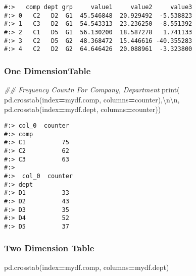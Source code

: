 \documentclass[
]{book}
\newenvironment{Shaded}{\begin{snugshade}}{\end{snugshade}}
\newcommand{\BuiltInTok}[1]{#1}
\newcommand{\CharTok}[1]{\textcolor[rgb]{0.5,0.5,0.5}{#1}}
\newcommand{\CommentTok}[1]{\textcolor[rgb]{0.37,0.37,0.37}{\textit{#1}}}
\newcommand{\NormalTok}[1]{#1}
\newcommand{\OperatorTok}[1]{\textcolor[rgb]{0.43,0.43,0.43}{\textbf{#1}}}
\newcommand{\StringTok}[1]{\textcolor[rgb]{0.5,0.5,0.5}{#1}}
\begin{document}
\begin{verbatim}
#:>   comp dept grp     value1     value2     value3
#:> 0   C2   D2  G1  45.546848  20.929492  -5.538823
#:> 1   C3   D2  G1  54.543313  23.236250  -8.551392
#:> 2   C1   D5  G1  56.130200  18.587278   1.741133
#:> 3   C2   D5  G2  48.368472  15.446616 -40.355283
#:> 4   C2   D2  G2  64.646426  20.088961  -3.323800
\end{verbatim}

\hypertarget{one-dimensiontable}{%
\subsubsection{One DimensionTable}\label{one-dimensiontable}}

\begin{Shaded}
\begin{Highlighting}[]
\CommentTok{\#\# Frequency Countn For Company, Department}
\BuiltInTok{print}\NormalTok{(}
\NormalTok{  pd.crosstab(index}\OperatorTok{=}\NormalTok{mydf.comp, columns}\OperatorTok{=}\StringTok{\textquotesingle{}counter\textquotesingle{}}\NormalTok{),}\StringTok{\textquotesingle{}}\CharTok{\textbackslash{}n\textbackslash{}n}\StringTok{\textquotesingle{}}\NormalTok{,}
\NormalTok{  pd.crosstab(index}\OperatorTok{=}\NormalTok{mydf.dept, columns}\OperatorTok{=}\StringTok{\textquotesingle{}counter\textquotesingle{}}\NormalTok{))}
\end{Highlighting}
\end{Shaded}

\begin{verbatim}
#:> col_0  counter
#:> comp          
#:> C1          75
#:> C2          62
#:> C3          63 
#:> 
#:>  col_0  counter
#:> dept          
#:> D1          33
#:> D2          43
#:> D3          35
#:> D4          52
#:> D5          37
\end{verbatim}

\hypertarget{two-dimension-table}{%
\subsubsection{Two Dimension Table}\label{two-dimension-table}}

\begin{Shaded}
\begin{Highlighting}[]
\NormalTok{pd.crosstab(index}\OperatorTok{=}\NormalTok{mydf.comp, columns}\OperatorTok{=}\NormalTok{mydf.dept)}
\end{Highlighting}
\end{Shaded}
\end{document}
